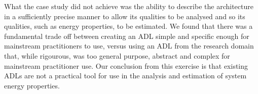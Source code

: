   What the case study did not achieve was the ability to describe the architecture in a sufficiently precise manner to allow its qualities to be analysed and so its qualities, such as energy properties, to be estimated.  We found that there was a fundamental trade off between creating an ADL simple and specific enough for mainstream practitioners to use, versus using an ADL from the research domain that, while rigourous, was too general purpose, abstract and complex for mainstream practitioner use.  Our conclusion from this exercise is that existing ADLs are not a practical tool for use in the analysis and estimation of system energy properties.



